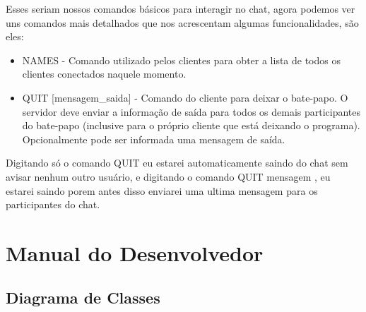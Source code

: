 \documentclass{abnt}
\begin{document}
	Esses seriam nossos comandos básicos para interagir no chat, agora podemos ver uns comandos mais detalhados que nos acrescentam algumas funcionalidades, são eles:
	
	\begin{itemize}
		\item NAMES - Comando utilizado pelos clientes para obter a lista de todos os clientes conectados 
		naquele momento.
		\item QUIT [mensagem\_saida] - Comando do cliente para deixar o bate-papo. O servidor deve enviar a informação de saída para todos os demais participantes do bate-papo (inclusive para o próprio cliente que está deixando o programa). Opcionalmente pode ser informada uma mensagem de saída.
	\end{itemize}
	Digitando só o comando QUIT eu estarei automaticamente saindo do chat sem avisar nenhum outro usuário, e digitando o comando QUIT mensagem , eu estarei saindo porem antes disso enviarei uma ultima mensagem para os participantes do chat.

\clearpage
\chapter{Manual do Desenvolvedor}
	\section{Diagrama de Classes}	
	
\end{document}
